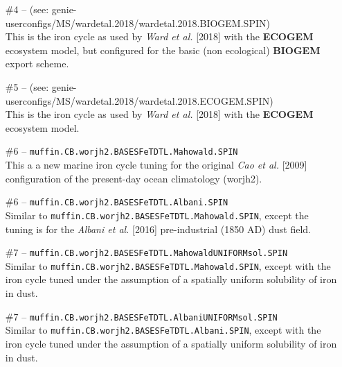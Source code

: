 \documentclass[11pt,fleqn]{book} %
\begin{document}
\begin{itemize}[noitemsep]
\vspace{1mm}
\item [\#4] -- (see: \textsf{\footnotesize genie-userconfigs/MS/wardetal.2018/wardetal.2018.BIOGEM.SPIN})
\vspace{1mm}
\\This is the iron cycle as used by \textit{Ward et al.} [2018] with the \textbf{ECOGEM} ecosystem model, but configured for the basic (non ecological) \textbf{BIOGEM} export scheme. 
\vspace{1mm}
\item [\#5] -- (see: \textsf{\footnotesize genie-userconfigs/MS/wardetal.2018/wardetal.2018.ECOGEM.SPIN})
\vspace{1mm}
\\This is the iron cycle as used by \textit{Ward et al.} [2018] with the \textbf{ECOGEM} ecosystem model.
\vspace{1mm}
\item [\#6] -- \texttt{muffin.CB.worjh2.BASESFeTDTL.Mahowald.SPIN}
\vspace{1mm}
\\This a a new marine iron cycle tuning for the original \textit{Cao et al.} [2009] configuration of the present-day ocean climatology (\textsf{\footnotesize worjh2}).
\vspace{1mm}
\item [\#6] -- \texttt{muffin.CB.worjh2.BASESFeTDTL.Albani.SPIN}
\vspace{1mm}
\\Similar to \texttt{\small muffin.CB.worjh2.BASESFeTDTL.Mahowald.SPIN}, except the tuning is for the \textit{Albani et al.} [2016] pre-industrial (1850 AD) dust field.
\vspace{1mm}
\item [\#7] -- \texttt{muffin.CB.worjh2.BASESFeTDTL.MahowaldUNIFORMsol.SPIN}
\vspace{1mm}
\\Similar to \texttt{\small muffin.CB.worjh2.BASESFeTDTL.Mahowald.SPIN}, except with the iron cycle tuned under the assumption of a spatially uniform solubility of iron in dust.
\vspace{1mm}
\item [\#7] -- \texttt{muffin.CB.worjh2.BASESFeTDTL.AlbaniUNIFORMsol.SPIN}
\vspace{1mm}
\\Similar to \texttt{\small muffin.CB.worjh2.BASESFeTDTL.Albani.SPIN}, except with the iron cycle tuned under the assumption of a spatially uniform solubility of iron in dust.
\end{itemize}
\vspace{2mm}
\end{document}
